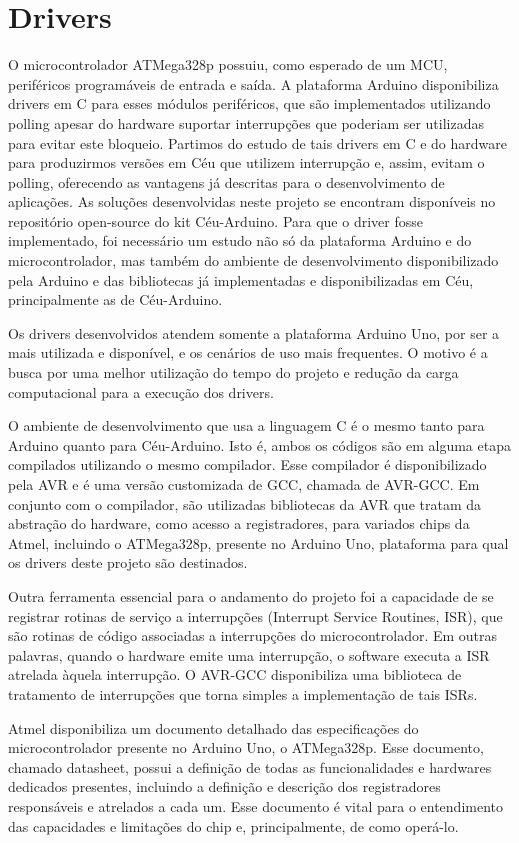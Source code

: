 \documentclass[11pt]{article}
\begin{document}
\section{Drivers}
\tab O microcontrolador ATMega328p possuiu, como esperado de um MCU, periféricos programáveis de entrada e saída. A plataforma Arduino disponibiliza drivers em C para esses módulos periféricos, que são implementados utilizando polling apesar do hardware suportar interrupções que poderiam ser utilizadas para evitar este bloqueio. Partimos do estudo de tais drivers em C e do hardware para produzirmos versões em Céu que utilizem interrupção e, assim, evitam o polling, oferecendo as vantagens já descritas para o desenvolvimento de aplicações. As soluções desenvolvidas neste projeto se encontram disponíveis no repositório open-source do kit Céu-Arduino. Para que o driver fosse implementado, foi necessário um estudo não só da plataforma Arduino e do microcontrolador, mas também do ambiente de desenvolvimento disponibilizado pela Arduino e das bibliotecas já implementadas e disponibilizadas em Céu, principalmente as de Céu-Arduino.
\par Os drivers desenvolvidos atendem somente a plataforma Arduino Uno, por ser a mais utilizada e disponível, e os cenários de uso mais frequentes. O motivo é a busca por uma melhor utilização do tempo do projeto e redução da carga computacional para a execução dos drivers.
\par O ambiente de desenvolvimento que usa a linguagem C é o mesmo tanto para Arduino quanto para Céu-Arduino. Isto é, ambos os códigos são em alguma etapa compilados utilizando o mesmo compilador. Esse compilador é disponibilizado pela AVR e é uma versão customizada de GCC, chamada de AVR-GCC. Em conjunto com o compilador, são utilizadas bibliotecas da AVR que tratam da abstração do hardware, como acesso a registradores, para variados chips da Atmel, incluindo o ATMega328p, presente no Arduino Uno, plataforma para qual os drivers deste projeto são destinados.
\par Outra ferramenta essencial para o andamento do projeto foi a capacidade de se registrar rotinas de serviço a interrupções (Interrupt Service Routines, ISR), que são rotinas de código associadas a interrupções do microcontrolador. Em outras palavras, quando o hardware emite uma interrupção, o software executa a ISR atrelada àquela interrupção. O AVR-GCC disponibiliza uma biblioteca de tratamento de interrupções que torna simples a implementação de tais ISRs.
\par Atmel disponibiliza um documento detalhado \cite{atmegadatasheet} das especificações do microcontrolador presente no Arduino Uno, o ATMega328p. Esse documento, chamado datasheet, possui a definição de todas as funcionalidades e hardwares dedicados presentes, incluindo a definição e descrição dos registradores responsáveis e atrelados a cada um. Esse documento é vital para o entendimento das capacidades e limitações do chip e, principalmente, de como operá-lo.
\end{document}
